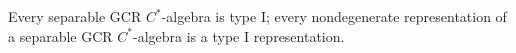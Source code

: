 Every separable GCR $C^*$-algebra is type I; every nondegenerate representation of a separable GCR $C^*$-algebra is a type I representation.

